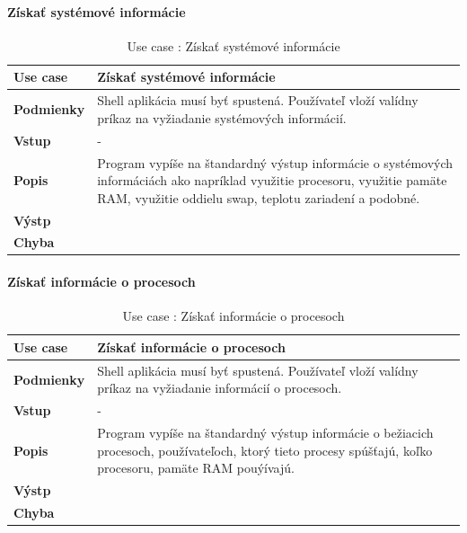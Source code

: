 \paragraph{Získať systémové informácie}
\begin{center}
	\begin{table}[htbp]
		\begin{tabular}{|p{2.5cm}|p{14cm}|}
			\hline
			\textbf{Use case} & Získať systémové informácie \\ 
			\hline
			\textbf{Podmienky} & Shell aplikácia musí byť spustená. Používateľ vloží valídny príkaz na vyžiadanie systémových informácií. \\ 
			\hline
			\textbf{Vstup} & -\\
			\hline
			\textbf{Popis} & Program vypíše na štandardný výstup informácie o systémových informáciách ako napríklad využitie procesoru, využitie pamäte RAM, využitie oddielu swap, teplotu zariadení a podobné.\\ 
			\hline
			\textbf{Výstp} & \\
			\hline
			\textbf{Chyba} & \\
			\hline
		\end{tabular}
		\label{table:1}
		\caption{Use case : Získať systémové informácie}
	\end{table}
\end{center}
\paragraph{Získať informácie o procesoch}
\begin{center}
	\begin{table}[htbp]
		\begin{tabular}{|p{2.5cm}|p{14cm}|}
			\hline
			\textbf{Use case} & Získať informácie o procesoch \\ 
			\hline
			\textbf{Podmienky} & Shell aplikácia musí byť spustená. Používateľ vloží valídny príkaz na vyžiadanie informácií o procesoch. \\ 
			\hline
			\textbf{Vstup} & -\\
			\hline
			\textbf{Popis} & Program vypíše na štandardný výstup informácie o bežiacich procesoch, používateľoch, ktorý tieto procesy spúšťajú, koľko procesoru, pamäte RAM pouýívajú.\\ 
			\hline
			\textbf{Výstp} & \\
			\hline
			\textbf{Chyba} & \\
			\hline
		\end{tabular}
		\label{table:1}
		\caption{Use case : Získať informácie o procesoch}
	\end{table}
\end{center}
\newpage

